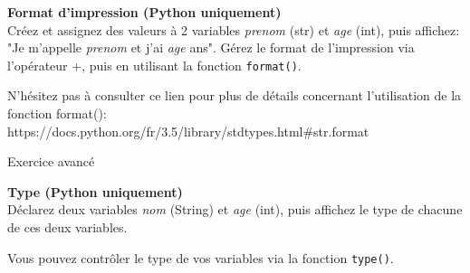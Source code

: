 \begin{Exercice}[5 minutes] \textbf{Format d'impression (Python uniquement)}\\
   Créez et assignez des valeurs à 2 variables \textit{prenom} (str) et \textit{age} (int), puis affichez: "Je m'appelle \textit{prenom} et j'ai \textit{age} ans". Gérez le format de l'impression via l'opérateur +, puis en utilisant la fonction \lstinline{format()}. \\
   
    \begin{conseil}
       N'hésitez pas à consulter ce lien pour plus de détails concernant l'utilisation de la fonction format(): \\
        https://docs.python.org/fr/3.5/library/stdtypes.html\#str.format 
        
    \end{conseil}
    \begin{solution}
     
    
           
    \end{solution}   
\end{Exercice}
 
 Exercice avancé
\begin{Exercice}[3 minutes] \textbf{Type (Python uniquement)}\\
   Déclarez deux variables \textit{nom} (String) et \textit{age} (int), puis affichez le type de chacune de ces deux variables.
   
    \begin{conseil}
       Vous pouvez contrôler le type de vos variables via la fonction \lstinline{type()}.
        
    \end{conseil}
    \begin{solution}
     
    
           
    \end{solution}   
\end{Exercice}

